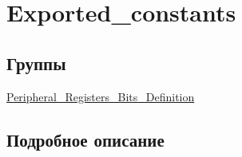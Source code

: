 \hypertarget{group___exported__constants}{}\section{Exported\+\_\+constants}
\label{group___exported__constants}
\subsection*{Группы}
\begin{DoxyCompactItemize}
\item 
\mbox{\hyperlink{group___peripheral___registers___bits___definition}{Peripheral\+\_\+\+Registers\+\_\+\+Bits\+\_\+\+Definition}}
\end{DoxyCompactItemize}


\subsection{Подробное описание}
